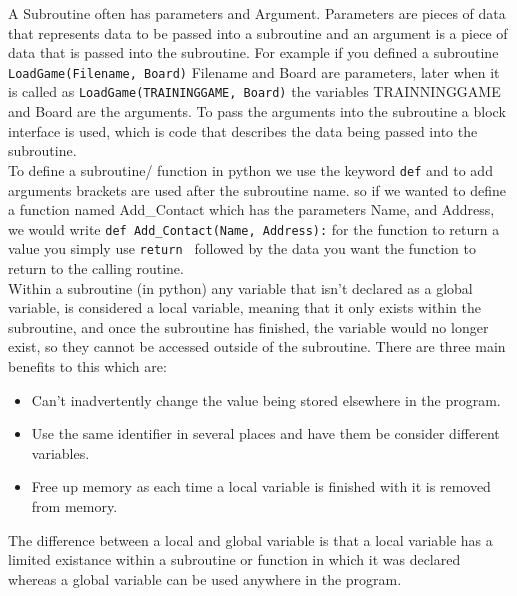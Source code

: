 \documentclass[a4paper]{article}
\begin{document}
			A Subroutine often has parameters and Argument. Parameters are pieces of data that represents data to be passed into a subroutine and an argument is a piece of data that is passed into the subroutine. For example if you defined a subroutine \verb|LoadGame(Filename, Board)| Filename and Board are parameters, later when it is called as \verb|LoadGame(TRAININGGAME, Board)| the variables TRAINNINGGAME and Board are the arguments. To pass the arguments into the subroutine a block interface is used, which is code that describes the data being passed into the subroutine.\\
			 To define a subroutine/ function in python we use the keyword \verb|def| and to add arguments brackets are used after the subroutine name. so if we wanted to define a function named Add\_Contact which has the parameters Name, and Address, we would write \verb|def Add_Contact(Name, Address):| for the function to return a value you simply use \verb|return | followed by the data you want the function to return to the calling routine.\\
			Within a subroutine (in python) any variable that isn't declared as a global variable, is considered a local variable, meaning that it only exists within the subroutine, and once the subroutine has finished, the variable would no longer exist, so they cannot be accessed outside of the subroutine. There are three main benefits to this which are:
			\begin{itemize}
				\setlength\itemsep{0em}
				\item Can't inadvertently change the value being stored elsewhere in the program.
				\item Use the same identifier in several places and have them be consider different variables.
				\item Free up memory as each time a local variable is finished with it is removed from memory.
			\end{itemize}
			 The difference between a local and global variable is that a local variable has a limited existance within a subroutine or function in which it was declared whereas a global variable can be used anywhere in the program.
\end{document}
